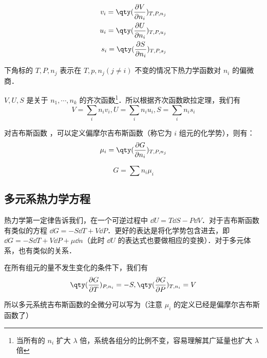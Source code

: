 \begin{equation}
\begin{aligned}
v_i=\qty(\frac{\partial V}{\partial n_i})_{T,P,n_j}\\
u_i=\qty(\frac{\partial U}{\partial n_i})_{T,P,u_j}\\
s_i=\qty(\frac{\partial S}{\partial n_i})_{T,P,s_j}
\end{aligned}
\end{equation}

下角标的 $T,P,n_j$ 表示在 $T,p,n_j(j\neq i)$ 不变的情况下热力学函数对 $n_i$ 的偏微商．

$V,U,S$ 是关于 $n_1,\cdots,n_k$ 的齐次函数\footnote{当所有的 $n_i$ 扩大 $\lambda$ 倍，系统各组分的比例不变，容易理解其广延量也扩大 $\lambda$ 倍}．所以根据齐次函数欧拉定理，我们有
\begin{equation}
V=\sum_i n_iv_i,U=\sum_i n_iu_i,S=\sum_i n_is_i
\end{equation}

对吉布斯函数 ，可以定义偏摩尔吉布斯函数（称它为 $i$ 组元的化学势），则有：
\begin{equation}
\mu_i=\qty(\frac{\partial G}{\partial n_i})_{T,P,n_j}
\end{equation}

\begin{equation}\label{mulTh_eq2}
G=\sum n_i \mu_i
\end{equation}

\subsection{多元系热力学方程}
热力学第一定律告诉我们，在一个可逆过程中 $\dd U=T\dd S-P\dd V$．对于吉布斯函数有类似的方程 $\dd G=-S\dd T+V\dd P$．更好的表达是将化学势包含进去，即 $\dd G=-S\dd T+V\dd P+\mu\dd n$（此时 $\dd U$ 的表达式也要做相应的变换）．对于多元体系，也有类似的关系．

在所有组元的量不发生变化的条件下，我们有
\begin{equation}
\qty(\frac{\partial G}{\partial T})_{P,n_i}=-S,\qty(\frac{\partial G}{\partial P})_{T,n_i}=V
\end{equation}

所以多元系统吉布斯函数的全微分可以写为（注意 $\mu_i$ 的定义已经是偏摩尔吉布斯函数了）

